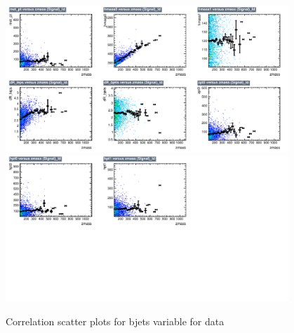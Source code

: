 \begin{figure}[!htb]%
\centering
\includegraphics[width=0.95\textwidth]{figures/CRTT/dataset/plots/correlationscatter_zmass__Id_c1.pdf}
\includegraphics[width=0.95\textwidth]{figures/CRTT/dataset/plots/correlationscatter_zmass__Id_c2.pdf}
\caption{ Correlation scatter plots for \Zll bjets variable for data}%
\label{fig:correlations_CRTT_zmass_S}                                                       
\end{figure}



